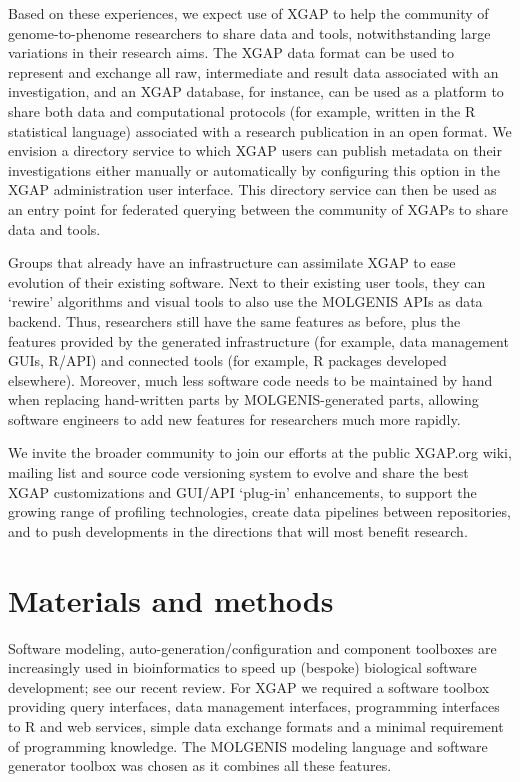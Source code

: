 \linespread{1.05} %

Based on these experiences, we expect use of XGAP to help the community of genome-to-phenome researchers to share data and tools, notwithstanding large variations in their research aims.
The XGAP data format can be used to represent and exchange all raw, intermediate and result data associated with an investigation, and an XGAP database, for instance, can be used as a platform to share both data and computational protocols (for example, written in the R statistical language) associated with a research publication in an open format.
We envision a directory service to which XGAP users can publish metadata on their investigations either manually or automatically by configuring this option in the XGAP administration user interface.
This directory service can then be used as an entry point for federated querying between the community of XGAPs to share data and tools.

Groups that already have an infrastructure can assimilate XGAP to ease evolution of their existing software.
Next to their existing user tools, they can ‘rewire’ algorithms and visual tools to also use the MOLGENIS APIs as data backend.
Thus, researchers still have the same features as before, plus the features provided by the generated infrastructure (for example, data management GUIs, R/API) and connected tools (for example, R packages developed elsewhere).
Moreover, much less software code needs to be maintained by hand when replacing hand-written parts by MOLGENIS-generated parts, allowing software engineers to add new features for researchers much more rapidly.

We invite the broader community to join our efforts at the public XGAP.org wiki, mailing list and source code versioning system to evolve and share the best XGAP customizations and GUI/API ‘plug-in’ enhancements, to support the growing range of profiling technologies, create data pipelines between repositories, and to push developments in the directions that will most benefit research.

\section{Materials and methods}
Software modeling, auto-generation/configuration and component toolboxes are increasingly used in bioinformatics to speed up (bespoke) biological software development; see our recent review\cite{Swertz_2007}.
For XGAP we required a software toolbox providing query interfaces, data management interfaces, programming interfaces to R and web services, simple data exchange formats and a minimal requirement of programming knowledge.
The MOLGENIS modeling language and software generator toolbox\cite{Swertz_2007, xgap_molgenurl} was chosen as it combines all these features.

